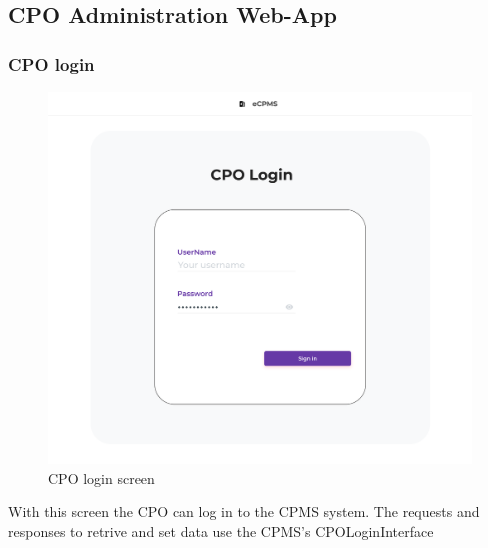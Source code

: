 \subsection{CPO Administration Web-App}

\subsubsection{CPO login}
\begin{center}
    \begin{figure}[H]
        \includegraphics[width=\textwidth]{./img/design/web/login.png}
        \caption{CPO login screen}
    \end{figure}
\end{center}
With this screen the CPO can log in to the CPMS system. The requests and responses to retrive and set data use the CPMS's CPOLoginInterface

